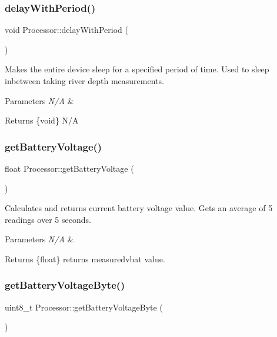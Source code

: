 \subsubsection{\texorpdfstring{delay\+With\+Period()}{delayWithPeriod()}}
{\footnotesize\ttfamily void Processor\+::delay\+With\+Period (\begin{DoxyParamCaption}{ }\end{DoxyParamCaption})}

Makes the entire device sleep for a specified period of time. Used to sleep inbetween taking river depth measurements. 
\begin{DoxyParams}{Parameters}
{\em N/A} & \\
\hline
\end{DoxyParams}
\begin{DoxyReturn}{Returns}
\{void\} N/A 
\end{DoxyReturn}
\mbox{\label{class_processor_aa467c82cb9a57d597487fc319c878c36}} 
\subsubsection{\texorpdfstring{get\+Battery\+Voltage()}{getBatteryVoltage()}}
{\footnotesize\ttfamily float Processor\+::get\+Battery\+Voltage (\begin{DoxyParamCaption}{ }\end{DoxyParamCaption})}

Calculates and returns current battery voltage value. Gets an average of 5 readings over 5 seconds. 
\begin{DoxyParams}{Parameters}
{\em N/A} & \\
\hline
\end{DoxyParams}
\begin{DoxyReturn}{Returns}
\{float\} returns measuredvbat value. 
\end{DoxyReturn}
\mbox{\label{class_processor_ae2385e41f86895199fb37e524a3f1e86}} 
\subsubsection{\texorpdfstring{get\+Battery\+Voltage\+Byte()}{getBatteryVoltageByte()}}
{\footnotesize\ttfamily uint8\+\_\+t Processor\+::get\+Battery\+Voltage\+Byte (\begin{DoxyParamCaption}{ }\end{DoxyParamCaption})}

